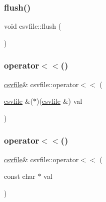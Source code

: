\mbox{\label{classcsvfile_a5955a8c1fea1af1c95a388aac391fada}} 
\subsubsection{\texorpdfstring{flush()}{flush()}}
{\footnotesize\ttfamily void csvfile\+::flush (\begin{DoxyParamCaption}{ }\end{DoxyParamCaption})\hspace{0.3cm}{\ttfamily [inline]}}

\mbox{\label{classcsvfile_aee44e4a9c1826eba97f476ba24572356}} 
\subsubsection{\texorpdfstring{operator$<$$<$()}{operator<<()}\hspace{0.1cm}{\footnotesize\ttfamily [1/4]}}
{\footnotesize\ttfamily \hyperlink{classcsvfile}{csvfile}\& csvfile\+::operator$<$$<$ (\begin{DoxyParamCaption}\item[{\hyperlink{classcsvfile}{csvfile} \&($\ast$)(\hyperlink{classcsvfile}{csvfile} \&)}]{val }\end{DoxyParamCaption})\hspace{0.3cm}{\ttfamily [inline]}}

\mbox{\label{classcsvfile_a2b9cd9120377c5e325b8d33ac17c7497}} 
\subsubsection{\texorpdfstring{operator$<$$<$()}{operator<<()}\hspace{0.1cm}{\footnotesize\ttfamily [2/4]}}
{\footnotesize\ttfamily \hyperlink{classcsvfile}{csvfile}\& csvfile\+::operator$<$$<$ (\begin{DoxyParamCaption}\item[{const char $\ast$}]{val }\end{DoxyParamCaption})\hspace{0.3cm}{\ttfamily [inline]}}


